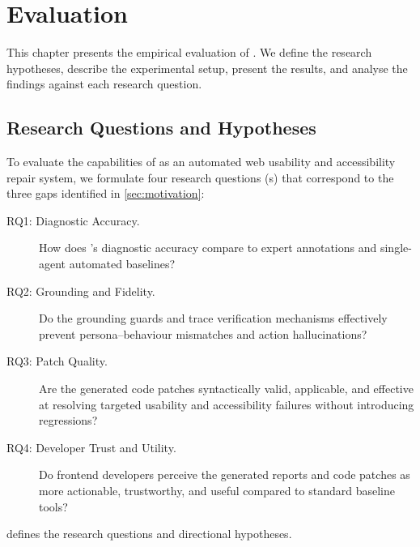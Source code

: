 \chapter{Evaluation}
\label{ch:evaluation}

This chapter presents the empirical evaluation of \versimux{}. We define the research hypotheses, describe the experimental setup, present the results, and analyse the findings against each research question.


\section{Research Questions and Hypotheses}
\label{sec:hypotheses}

To evaluate the capabilities of \versimux{} as an automated web usability and accessibility repair system, we formulate four research questions (s) that correspond to the three gaps identified in \cref{sec:motivation}:

\begin{description}
  \item[RQ1: Diagnostic Accuracy.] How does \versimux{}'s diagnostic accuracy compare to expert annotations and single-agent automated baselines?
  \item[RQ2: Grounding and Fidelity.] Do the grounding guards and trace verification mechanisms effectively prevent persona--behaviour mismatches and action hallucinations?
  \item[RQ3: Patch Quality.] Are the generated code patches syntactically valid, applicable, and effective at resolving targeted usability and accessibility failures without introducing regressions?
  \item[RQ4: Developer Trust and Utility.] Do frontend developers perceive the generated reports and code patches as more actionable, trustworthy, and useful compared to standard baseline tools?
\end{description}

 defines the research questions and directional hypotheses.

